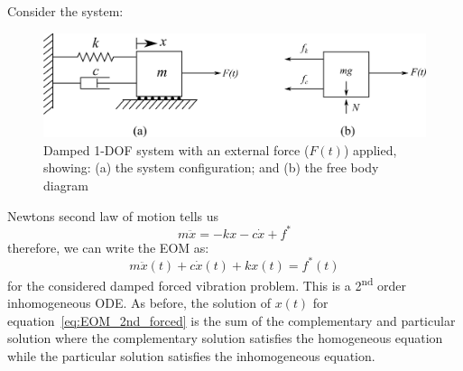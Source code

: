 \documentclass[12pt,letter]{article}
\numberwithin{ex}{section} %
\numberwithin{re}{section} %
\numberwithin{equation}{section}	%
\begin{document}
Consider the system:
\begin{figure}[H]
	\centering
	\includegraphics[]{../figures/1-DOF-spring_dashpot_mass_horizontal_forced_FBD.png}
	\caption{Damped 1-DOF system with an external force ($F(t)$) applied, showing: (a) the system configuration; and (b) the free body diagram}
\end{figure}
Newtons second law of motion tells us
\begin{equation}
m \ddot{x} = -kx - c\dot{x} + f^*
\end{equation}
therefore, we can write the EOM as:
\begin{equation}
m \ddot{x}(t) + c\dot{x}(t) + kx(t) = f^*(t)
\label{eq:EOM_2nd_forced}
\end{equation}
for the considered damped forced vibration problem. This is a 2\textsuperscript{nd} order inhomogeneous ODE. As before, the solution of $x(t)$ for equation~\ref{eq:EOM_2nd_forced} is the sum of the complementary and particular solution where the complementary solution satisfies the homogeneous equation while the particular solution satisfies the inhomogeneous equation. 
\end{document}
